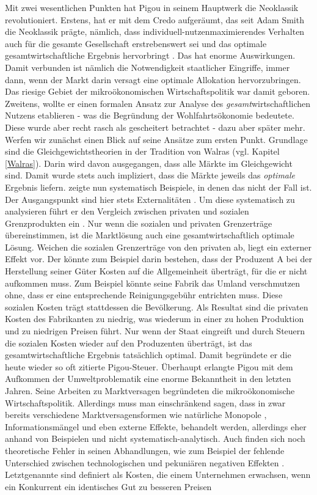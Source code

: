 Mit zwei wesentlichen Punkten hat Pigou in seinem Hauptwerk die Neoklassik revolutioniert. Erstens, hat er mit dem Credo aufgeräumt, das seit Adam Smith die Neoklassik prägte, nämlich, dass individuell-nutzenmaximierendes Verhalten auch für die gesamte Gesellschaft erstrebenswert sei und das optimale gesamtwirtschaftliche Ergebnis hervorbringt \parencite[S. 111]{Pigou1920}. Das hat enorme Auswirkungen. Damit verbunden ist nämlich die Notwendigkeit staatlicher Eingriffe, immer dann, wenn der Markt darin versagt eine optimale Allokation hervorzubringen. Das riesige Gebiet der mikroökonomischen Wirtschaftspolitik war damit geboren. Zweitens, wollte er einen formalen Ansatz zur Analyse des \textit{gesamt}wirtschaftlichen Nutzens etablieren - was die Begründung der Wohlfahrtsökonomie bedeutete. Diese wurde aber recht rasch als gescheitert betrachtet - dazu aber später mehr. Werfen wir zunächst einen Blick auf seine Ansätze zum ersten Punkt. Grundlage sind die Gleichgewichtstheorien in der Tradition von Walras (vgl. Kapitel \ref{Walras}). Darin wird davon ausgegangen, dass alle Märkte im Gleichgewicht sind. Damit wurde stets auch impliziert, dass die Märkte jeweils das \textit{optimale} Ergebnis liefern. \textcite{Pigou1920} zeigte nun systematisch Beispiele, in denen das nicht der Fall ist. Der Ausgangspunkt sind hier stets Externalitäten \parencite[S. 115]{Pigou1920}. Um diese systematisch zu analysieren führt er den Vergleich zwischen privaten und sozialen Grenzprodukten ein \parencite[S. 114]{Pigou1920}. Nur wenn die sozialen und privaten Grenzerträge übereinstimmen, ist die Marktlösung auch eine gesamtwirtschaftlich optimale Lösung. Weichen die sozialen Grenzerträge von den privaten ab, liegt ein externer Effekt vor. Der könnte zum Beispiel darin bestehen, dass der Produzent A bei der Herstellung seiner Güter Kosten auf die Allgemeinheit überträgt, für die er nicht aufkommen muss. Zum Beispiel könnte seine Fabrik das Umland verschmutzen ohne, dass er eine entsprechende Reinigungsgebühr entrichten muss. Diese sozialen Kosten trägt stattdessen die Bevölkerung. Als Resultat sind die privaten Kosten des Fabrikanten zu niedrig, was wiederum in einer zu hohen Produktion und zu niedrigen Preisen führt. Nur wenn der Staat eingreift und durch Steuern die sozialen Kosten wieder auf den Produzenten überträgt, ist das gesamtwirtschaftliche Ergebnis tatsächlich optimal. Damit begründete er die heute wieder so oft zitierte Pigou-Steuer. Überhaupt erlangte Pigou mit dem Aufkommen der Umweltproblematik eine enorme Bekanntheit in den letzten Jahren. Seine Arbeiten zu Marktversagen begründeten die mikroökonomische Wirtschaftspolitik. Allerdings muss man einschränkend sagen, dass in \textcite{Pigou1920} zwar bereits verschiedene Marktversagensformen wie natürliche Monopole \parencite[S. 240]{Pigou1920}, Informationsmängel \parencite[S. 131]{Pigou1920} und eben externe Effekte, behandelt werden, allerdings eher anhand von Beispielen und nicht systematisch-analytisch. Auch finden sich noch theoretische Fehler in seinen Abhandlungen, wie zum Beispiel der fehlende Unterschied zwischen technologischen und pekuniären negativen Effekten \parencite[S. 242]{Cansier1989}. Letztgenannte sind definiert als Kosten, die einem Unternehmen erwachsen, wenn ein Konkurrent ein identisches Gut zu besseren Preisen 